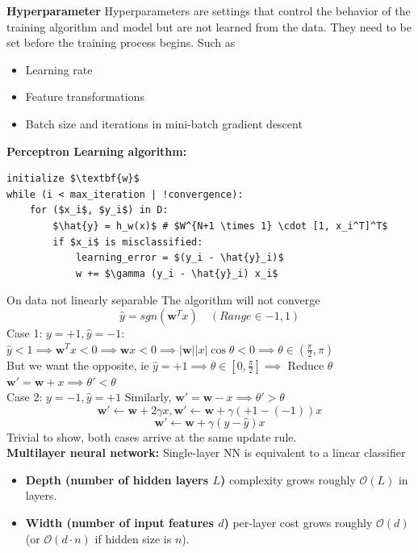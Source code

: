 \documentclass[8pt,twocolumn]{article}
\begin{document}
\textbf{Hyperparameter}
Hyperparameters are settings that control the behavior of the training algorithm and model but are not learned from the data. They need to be set before the training process begins. Such as \vspace{-0.6em}
\begin{itemize}
    \setlength{\itemsep}{0pt}
    \setlength{\parskip}{0pt}
    \item Learning rate
    \item Feature transformations
    \item Batch size and iterations in mini-batch gradient descent
\end{itemize}\vspace{-0.6em}
\textbf{Perceptron Learning algorithm:}\vspace{-0.6em}
\begin{lstlisting}[mathescape = true]
initialize $\textbf{w}$
while (i < max_iteration | !convergence):
    for ($x_i$, $y_i$) in D:
        $\hat{y} = h_w(x)$ # $W^{N+1 \times 1} \cdot [1, x_i^T]^T$
        if $x_i$ is misclassified:
            learning_error = $(y_i - \hat{y}_i)$
            w += $\gamma (y_i - \hat{y}_i) x_i$
\end{lstlisting}\vspace{-0.6em}
On data not linearly separable The algorithm will not converge
    \[\hat{y} = sgn(\textbf{w}^Tx)\quad (Range \in {-1, 1})\]
Case 1: $y = +1, \hat{y} = -1$: $\hat{y} < 1 \implies \textbf{w}^Tx < 0 \implies \textbf{w}x < 0 \implies |\textbf{w}||x|\cos\theta < 0 \implies \theta \in (\frac{\pi}{2}, \pi)$\\
\indent But we want the opposite, ie $\hat{y} = +1 \implies \theta \in [0, \frac{\pi}{2}] \implies$ Reduce $\theta$\\
\indent $\textbf{w}' = \textbf{w} + x \implies \theta' < \theta$ \\
Case 2: $y = -1, \hat{y} = +1$ Similarly, $\textbf{w}' = \textbf{w} - x \implies \theta' > \theta$\\
\[\textbf{w}' \leftarrow \textbf{w} + 2\gamma x, \textbf{w}' \leftarrow \textbf{w} + \gamma(+1 - (-1)) x \]
\[\textbf{w}' \leftarrow \textbf{w} + \gamma(y - \hat{y}) x \]
Trivial to show, both cases arrive at the same update rule.\\
\textbf{Multilayer neural network:}
Single-layer NN is equivalent to a linear classifier\vspace{-0.6em}
\begin{itemize}
    \setlength{\itemsep}{0pt}
    \setlength{\parskip}{0pt}
    \item \textbf{Depth (number of hidden layers $L$)} complexity grows roughly $\mathcal{O}(L)$ in layers.
    \item \textbf{Width (number of input features $d$)} per‐layer cost grows roughly $\mathcal{O}(d)$ (or $\mathcal{O}(d\cdot n)$ if hidden size is $n$).
  \end{itemize}\vspace{-0.6em}
\end{document}
